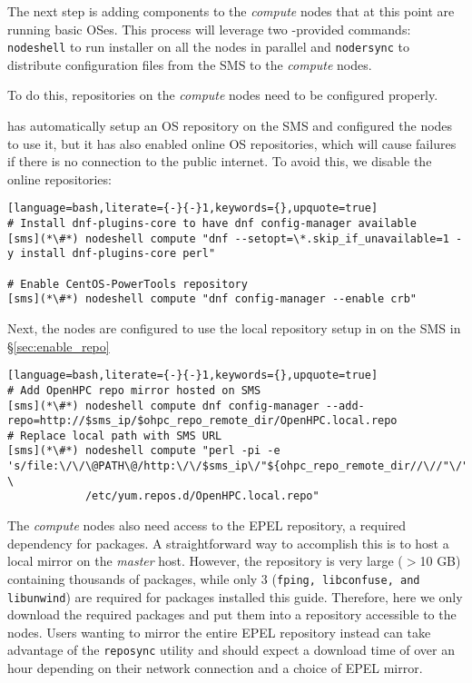 
The next step is adding \OHPC{} components to the {\em compute} nodes that at this
point are running basic OSes.  This process will leverage two \Confluent{}-provided
commands: \texttt{nodeshell} to run \texttt{\pkgmgr{}} installer on all the
nodes in parallel  and \texttt{nodersync} to distribute configuration files from the
SMS to the {\em compute} nodes.

\noindent To do this, repositories on the {\em compute} nodes need to be configured
properly.

\Confluent{} has automatically setup an  OS repository on the SMS and configured the
nodes to use it, but it has  also enabled online OS repositories, which will
cause  \texttt{\pkgmgr{}} failures if there is no connection to the public internet.
To avoid this, we disable the online repositories:

\begin{lstlisting}[language=bash,literate={-}{-}1,keywords={},upquote=true]
# Install dnf-plugins-core to have dnf config-manager available
[sms](*\#*) nodeshell compute "dnf --setopt=\*.skip_if_unavailable=1 -y install dnf-plugins-core perl"

# Enable CentOS-PowerTools repository
[sms](*\#*) nodeshell compute "dnf config-manager --enable crb"
\end{lstlisting}

\noindent Next, the nodes are configured to use the local \OHPC{} repository
setup in on the SMS in \S\ref{sec:enable_repo}

\begin{lstlisting}[language=bash,literate={-}{-}1,keywords={},upquote=true]
# Add OpenHPC repo mirror hosted on SMS
[sms](*\#*) nodeshell compute dnf config-manager --add-repo=http://$sms_ip/$ohpc_repo_remote_dir/OpenHPC.local.repo
# Replace local path with SMS URL
[sms](*\#*) nodeshell compute "perl -pi -e 's/file:\/\/\@PATH\@/http:\/\/$sms_ip\/"${ohpc_repo_remote_dir//\//"\/"}"/s' \
            /etc/yum.repos.d/OpenHPC.local.repo"
\end{lstlisting}

The {\em compute} nodes also need access to the EPEL repository, a required
dependency for \OHPC{} packages. A straightforward way to accomplish this is to
host a local mirror on the {\em master} host. However, the repository is very
large ($>$10 GB) containing thousands of packages, while only 3 (\texttt{fping,
libconfuse, and libunwind}) are required for packages installed this guide.  Therefore,
here we only download the required packages and put them into a repository
accessible to the nodes.  Users wanting to mirror the entire EPEL repository
instead can take advantage of the \texttt{reposync} utility and should expect a
download time of over an hour depending on their network connection and a choice
of EPEL mirror.

